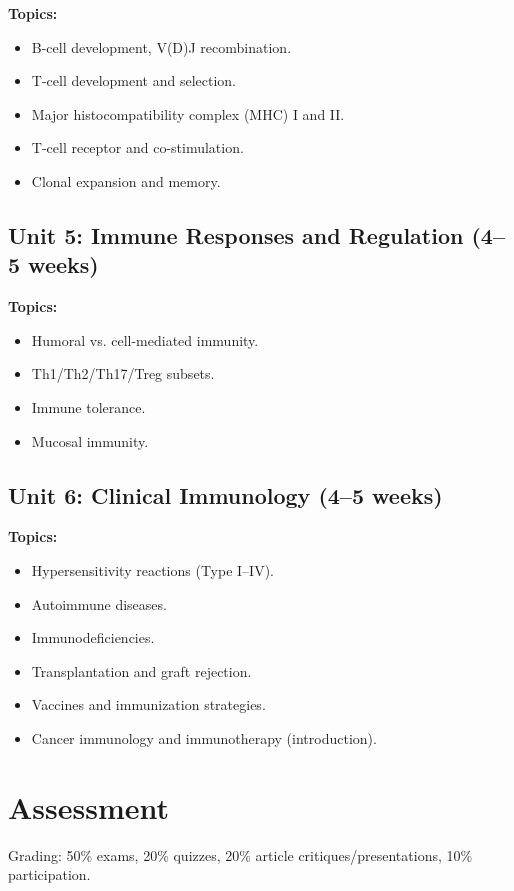 \documentclass[12pt,oneside]{book}
\begin{document}
\textbf{Topics:}
\begin{itemize}
    \item B-cell development, V(D)J recombination.
    \item T-cell development and selection.
    \item Major histocompatibility complex (MHC) I and II.
    \item T-cell receptor and co-stimulation.
    \item Clonal expansion and memory.
\end{itemize}

\subsection{Unit 5: Immune Responses and Regulation (4--5 weeks)}

\textbf{Topics:}
\begin{itemize}
    \item Humoral vs. cell-mediated immunity.
    \item Th1/Th2/Th17/Treg subsets.
    \item Immune tolerance.
    \item Mucosal immunity.
\end{itemize}

\subsection{Unit 6: Clinical Immunology (4--5 weeks)}

\textbf{Topics:}
\begin{itemize}
    \item Hypersensitivity reactions (Type I--IV).
    \item Autoimmune diseases.
    \item Immunodeficiencies.
    \item Transplantation and graft rejection.
    \item Vaccines and immunization strategies.
    \item Cancer immunology and immunotherapy (introduction).
\end{itemize}

\section{Assessment}

Grading: 50\% exams, 20\% quizzes, 20\% article critiques/presentations, 10\% participation.
\end{document}
